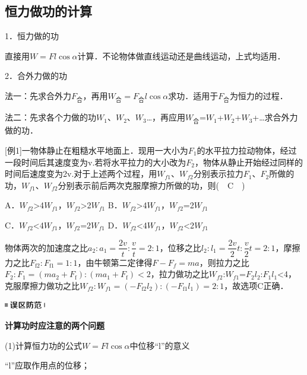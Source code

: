 \newpage
\subsection{恒力做功的计算}

1．恒力做的功

直接用$W=Fl\cos \alpha$计算．不论物体做直线运动还是曲线运动，上式均适用．

2．合外力做的功

法一：先求合外力$F_{\text{合}}$，再用$W_{\text{合}}=F_{\text{合}}l\cos \alpha$求功．适用于$F_{\text{合}}$为恒力的过程．

法二：先求各个力做的功$W_1$、$W_2$、$W_3$\ldots，再应用$W_{\text{合}}$=$W_1$+$W_2$+$W_3$+\ldots 求合外力做的功．

{[}例1{]}一物体静止在粗糙水平地面上．现用一大小为$F_1$的水平拉力拉动物体，经过一段时间后其速度变为v.若将水平拉力的大小改为$F_2$，物体从静止开始经过同样的时间后速度变为2v.对于上述两个过程，用$W_{f1}$、$W_{f2}$分别表示拉力$F_1$、$F_2$所做的功，$W_{f1}$、$W_{f2}$分别表示前后两次克服摩擦力所做的功，则(　C　)

A．$W_{f2}$\textgreater4$W_{f1}$，$W_{f2}$\textgreater2$W_{f1}$
B．$W_{f2}$\textgreater4$W_{f1}$，$W_{f2}$=2$W_{f1}$

C．$W_{f2}$\textless4$W_{f1}$，$W_{f2}$=2$W_{f1}$ D．$W_{f2}$\textless4$W_{f1}$，$W_{f2}$\textless2$W_{f1}$
\begin{solution}
	物体两次的加速度之比$a_{2}: a_{1}=\dfrac{2 v}{t}: \dfrac{v}{t}=2: 1$，位移之比$l_{2}: l_{1}=\dfrac{2 v}{2} t: \dfrac{v}{2} t=2: 1$，摩擦力之比$F_{\mathrm{f} 2}: F_{\mathrm{f} 1}=1: 1$，由牛顿第二定律得$F-F_f=ma$，则拉力之比$F_{2}: F_{1}=\left(m a_{2}+F_{\mathrm{f}}\right):\left(m a_{1}+F_{\mathrm{f}}\right)<2$，拉力做功之比$W_{f2}$:$W_{f1}$=$F_2$$l_2$:$F_1$$l_1$\textless4，克服摩擦力做功之比$W_{f2}:W_{f1}=\left(-F_{\mathrm{f} 2} l_{2}\right):\left(-F_{\mathrm{f} 1} l_{1}\right)=2: 1$，故选项C正确．
\end{solution}


\begin{center}\includegraphics[width=0.70833in,height=0.125in]{media/image34.png}

\textbf{计算功时应注意的两个问题}
\end{center}


(1)计算恒力功的公式$W=Fl\cos \alpha$中位移``l''的意义

``l''应取作用点的位移；


